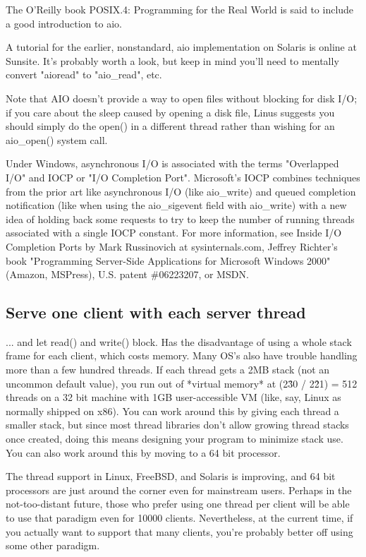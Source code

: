 \documentclass[twoside, xetex]{report}
\begin{document}
The O'Reilly book POSIX.4: Programming for the Real World is said to include a good introduction to aio.

A tutorial for the earlier, nonstandard, aio implementation on Solaris is online at Sunsite. It's probably worth a look, but keep in mind you'll need to mentally convert "aioread" to "aio\_read", etc.

Note that AIO doesn't provide a way to open files without blocking for disk I/O; if you care about the sleep caused by opening a disk file, Linus suggests you should simply do the open() in a different thread rather than wishing for an aio\_open() system call.

Under Windows, asynchronous I/O is associated with the terms "Overlapped I/O" and IOCP or "I/O Completion Port". Microsoft's IOCP combines techniques from the prior art like asynchronous I/O (like aio\_write) and queued completion notification (like when using the aio\_sigevent field with aio\_write) with a new idea of holding back some requests to try to keep the number of running threads associated with a single IOCP constant. For more information, see Inside I/O Completion Ports by Mark Russinovich at sysinternals.com, Jeffrey Richter's book "Programming Server-Side Applications for Microsoft Windows 2000" (Amazon, MSPress), U.S. patent \#06223207, or MSDN.

\subsection*{Serve one client with each server thread}

... and let read() and write() block. Has the disadvantage of using a whole stack frame for each client, which costs memory. Many OS's also have trouble handling more than a few hundred threads. If each thread gets a 2MB stack (not an uncommon default value), you run out of *virtual memory* at (2\^30 / 2\^21) = 512 threads on a 32 bit machine with 1GB user-accessible VM (like, say, Linux as normally shipped on x86). You can work around this by giving each thread a smaller stack, but since most thread libraries don't allow growing thread stacks once created, doing this means designing your program to minimize stack use. You can also work around this by moving to a 64 bit processor.

The thread support in Linux, FreeBSD, and Solaris is improving, and 64 bit processors are just around the corner even for mainstream users. Perhaps in the not-too-distant future, those who prefer using one thread per client will be able to use that paradigm even for 10000 clients. Nevertheless, at the current time, if you actually want to support that many clients, you're probably better off using some other paradigm.
\end{document}
